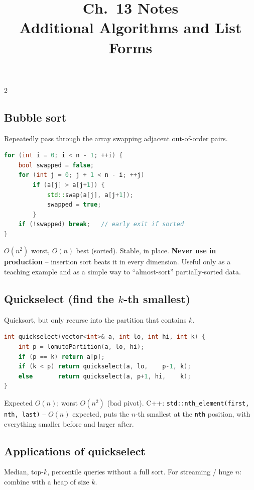 \documentclass[10pt]{article}
\title{Ch.~13 Notes\\\large Additional Algorithms and List Forms}
\author{}
\date{}
\begin{document}
\maketitle
\vspace{-2em}

\begin{multicols}{2}

\subsection*{Bubble sort}
Repeatedly pass through the array swapping adjacent
out-of-order pairs.
\begin{lstlisting}[language=C++]
for (int i = 0; i < n - 1; ++i) {
    bool swapped = false;
    for (int j = 0; j + 1 < n - i; ++j)
        if (a[j] > a[j+1]) {
            std::swap(a[j], a[j+1]);
            swapped = true;
        }
    if (!swapped) break;   // early exit if sorted
}
\end{lstlisting}
$O(n^2)$ worst, $O(n)$ best (sorted). Stable, in place.
\textbf{Never use in production} -- insertion sort beats it in
every dimension. Useful only as a teaching example and as a
simple way to ``almost-sort'' partially-sorted data.

\subsection*{Quickselect (find the $k$-th smallest)}
Quicksort, but only recurse into the partition that contains $k$.
\begin{lstlisting}[language=C++]
int quickselect(vector<int>& a, int lo, int hi, int k) {
    int p = lomutoPartition(a, lo, hi);
    if (p == k) return a[p];
    if (k < p) return quickselect(a, lo,    p-1, k);
    else       return quickselect(a, p+1, hi,    k);
}
\end{lstlisting}
Expected $O(n)$; worst $O(n^2)$ (bad pivot). C++:
\texttt{std::nth\_element(first, nth, last)} -- $O(n)$ expected,
puts the $n$-th smallest at the \texttt{nth} position, with
everything smaller before and larger after.

\subsection*{Applications of quickselect}
Median, top-$k$, percentile queries without a full sort. For
streaming / huge $n$: combine with a heap of size $k$.


\end{multicols}
\end{document}
